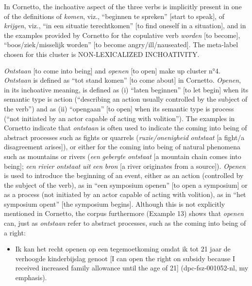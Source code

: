 In Cornetto, the inchoative aspect of the three verbs is implicitly present in one of the definitions of \textit{komen}, viz., “beginnen te spreken” [start to speak], of \textit{krijgen}, viz., “in een situatie terechtkomen” [to find oneself in a situation], and in the examples provided by Cornetto for the copulative verb \textit{worden} [to become], “boos/ziek/misselijk worden” [to become angry/ill/nauseated]. The meta-label chosen for this cluster is NON-LEXICALIZED INCHOATIVITY.

\textit{Ontstaan} [to come into being] and \textit{openen} [to open] make up cluster n°4. \textit{Ontstaan} is defined as “tot stand komen” [to come about] in Cornetto. \textit{Openen}, in its inchoative meaning, is defined as (i) “laten beginnen” [to let begin] when its semantic type is action (“describing an action usually controlled by the subject of the verb”) and as (ii) “opengaan” [to open] when its semantic type is process (“not initiated by an actor capable of acting with volition”). The examples in Cornetto indicate that \textit{ontstaan} is often used to indicate the coming into being of abstract processes such as fights or quarrels (\textit{ruzie/onenigheid} \textit{ontstaat} [a fight/a disagreement arises]), or either for the coming into being of natural phenomena such as mountains or rivers (\textit{een} \textit{gebergte} \textit{ontstaat} [a mountain chain comes into being]; \textit{een} \textit{rivier} \textit{ontstaat} \textit{uit} \textit{een} \textit{bron} [a river originates from a source]). \textit{Openen} is used to introduce the beginning of an event, either as an action (controlled by the subject of the verb), as in “een symposium openen” [to open a symposium] or as a process (not initiated by an actor capable of acting with volition), as in “het symposium opent” [the symposium begins]. Although this is not explicitly mentioned in Cornetto, the corpus furthermore (Example 13) shows that \textit{openen} can, just as \textit{ontstaan} refer to abstract processes, such as the coming into being of a right:

\begin{itemize}
\item \begin{styleVoorbeeld}
Ik kan het recht openen op een tegemoetkoming omdat ik tot 21 jaar de verhoogde kinderbijslag genoot [I can open the right on subsidy because I received increased family allowance until the age of 21] (dpc-fsz-001052-nl, my emphasis).
\end{styleVoorbeeld}
\end{itemize}

